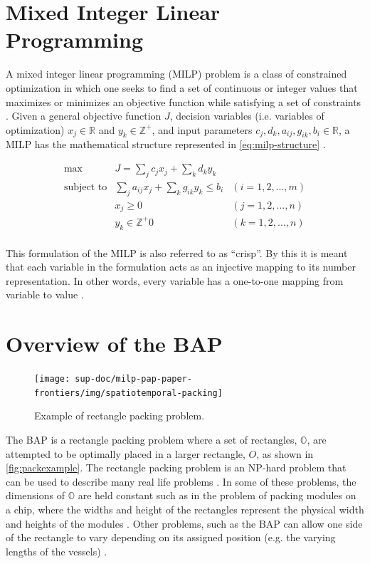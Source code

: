 \documentclass[ee,msthesis]{usuthesis}
\begin{document}
\section{Mixed Integer Linear Programming}
\label{sec:orga00b0d5}

A mixed integer linear programming (MILP) problem is a class of constrained optimization in which one seeks to find a
set of continuous or integer values that maximizes or minimizes an objective function while satisfying a set of
constraints \cite{chen-2010-applied}. Given a general objective function \(J\), decision variables (i.e. variables of
optimization) \(x_j \in \mathbb{R}\) and \(y_k \in \mathbb{Z}^+\), and input parameters \(c_j, d_k, a_{ij}, g_{ik}, b_i \in \mathbb{R}\), a MILP has the
mathematical structure represented in \ref{eq:milp-structure} \cite{chen-2010-applied}.

\begin{equation}
\label{eq:milp-structure}
\begin{array}{lll}
\text{max}   & J = \sum_j c_j x_j + \sum_k d_k y_k            &                 \\
\text{subject to} & \sum_j a_{ij} x_j + \sum_k g_{ik} y_k  \le b_i & (i = 1,2,...,m) \\
                  & x_j \ge 0                                      & (j = 1,2,...,n) \\
                  & y_k \in \mathbb{Z^+}0                          & (k = 1,2,...,n) \\
\end{array}
\end{equation}

This formulation of the MILP is also referred to as ``crisp''. By this it is meant that each variable in the formulation
acts as an injective mapping to its number representation. In other words, every variable has a one-to-one mapping from
variable to value \cite{kaur-2016-introd-fuzzy}.

\section{Overview of the BAP}
\label{sec:overview-of-the-bap}
\begin{figure}
  \centering
  \texttt{[image: sup-doc/milp-pap-paper-frontiers/img/spatiotemporal-packing]}
  \caption{Example of rectangle packing problem.}
  \label{fig:bap}
\end{figure}

The BAP is a rectangle packing problem where a set of rectangles, \(\mathbb{O}\), are attempted to be optimally placed in
a larger rectangle, \(O\), as shown in \autoref{fig:packexample}. The rectangle packing problem is an NP-hard problem that
can be used to describe many real life problems \cite{bruin-2013-rectan-packin,murata-1995-rectan}. In some of these
problems, the dimensions of \(\mathbb{O}\) are held constant such as in the problem of packing modules on a chip, where
the widths and height of the rectangles represent the physical width and heights of the modules
\cite{murata-1995-rectan}. Other problems, such as the BAP can allow one side of the rectangle to vary depending on its
assigned position (e.g. the varying lengths of the vessels) \cite{buhrkal-2011-model-discr}.
\end{document}
